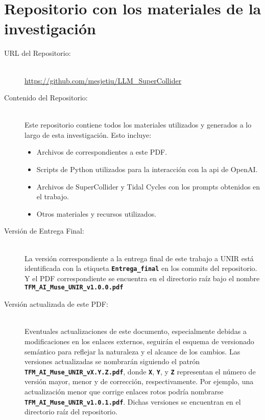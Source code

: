 \chapter{Repositorio con los materiales de la investigación}
\label{anexo:repositorio}



\begin{description}
    \item[URL del Repositorio:] \hfill \\
    \url{https://github.com/mesjetiu/LLM_SuperCollider} 
    
    \item[Contenido del Repositorio:] \hfill \\
    Este repositorio contiene todos los materiales utilizados y generados a lo largo de esta investigación. Esto incluye:
    \begin{itemize}
        \item Archivos de  correspondientes a este PDF.
        \item Scripts de Python utilizados para la interacción con la \gls{api} de OpenAI.
        \item Archivos de SuperCollider y Tidal Cycles con los {prompts} obtenidos en el trabajo.
        \item Otros materiales y recursos utilizados.
    \end{itemize}
    
    \item[Versión de Entrega Final:] \hfill \\
    La versión correspondiente a la entrega final de este trabajo a UNIR está identificada con la etiqueta \textbf{\texttt{Entrega\_final}} en los commits del repositorio. Y el PDF correspondiente se encuentra en el directorio raíz bajo el nombre \textbf{\texttt{TFM\_AI\_Muse\_UNIR\_v1.0.0.pdf}}

	\item[Versión actualizada de este PDF:] \hfill \\
    Eventuales actualizaciones de este documento, especialmente debidas a modificaciones en los enlaces externos, seguirán el esquema de versionado semántico para reflejar la naturaleza y el alcance de los cambios. Las versiones actualizadas se nombrarán siguiendo el patrón \textbf{\texttt{TFM\_AI\_Muse\_UNIR\_vX.Y.Z.pdf}}, donde \textbf{\texttt{X}}, \textbf{\texttt{Y}}, y \textbf{\texttt{Z}} representan el número de versión mayor, menor y de corrección, respectivamente. Por ejemplo, una actualización menor que corrige enlaces rotos podría nombrarse \textbf{\texttt{TFM\_AI\_Muse\_UNIR\_v1.0.1.pdf}}. Dichas versiones se encuentran en el directorio raíz del repositorio.


\end{description}



